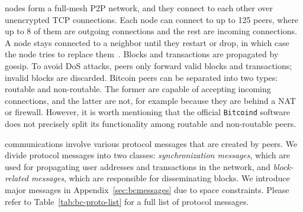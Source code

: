 	\bc nodes form a full-mesh P2P network, and they connect to each other over unencrypted TCP connections. 
	Each node can connect to   up to 125 peers, where up to 8 of them are  outgoing connections and the rest are incoming connections. A node stays connected to a neighbor until they restart or drop, in which case the node tries to replace them~\cite{Bitcoinnetworkoverview}. 
	Blocks and transactions are propagated by gossip. To avoid DoS attacks, peers only forward valid blocks and transactions; invalid blocks are discarded. 
Bitcoin peers can be separated into two types: routable and non-routable. The former are capable of accepting incoming connections, and the latter are not, for example because they are behind a NAT or firewall. However, it is worth mentioning that the official {\tt Bitcoind} software does not precisely split its functionality among routable and non-routable peers. 

	 \bc   communications involve various protocol messages that are created by  \bc peers. 
	 We divide \bc protocol messages into two classes: \emph{synchronization messages},  which are used for  propagating user addresses and transactions in the \bc network, and \emph{block-related messages}, which are responsible for disseminating \bc blocks. We introduce  major \bc messages in  Appendix~\ref{sec:bcmessages} due to space constraints.
	Please refer to Table~\ref{tab:bc-proto-list} for a full list of \bc protocol messages.

